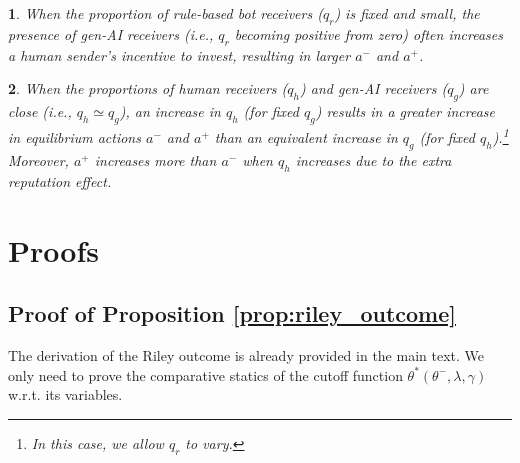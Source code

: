 \documentclass[english,12pt]{article}
\theoremstyle{plain}
\theoremstyle{plain}
\theoremstyle{definition}
\theoremstyle{definition}
\theoremstyle{assumption}
\theoremstyle{plain}
\theoremstyle{plain}
\theoremstyle{plain}
\theoremstyle{plain}
\theoremstyle{definition}%
\theoremstyle{plain}
\theoremstyle{plain}
\theoremstyle{plain}
\theoremstyle{plain}
\theoremstyle{plain}
\newtheorem{prediction}{\protect\predictionname}
\providecommand{\predictionname}{Prediction}
\begin{document}
\begin{prediction}
    When the proportion of rule-based bot receivers ($q_r$) is fixed and small, the presence of gen-AI receivers (i.e., $q_r$ becoming positive from zero) often increases a human sender's incentive to invest, resulting in larger $a^-$ and $a^+$.
\end{prediction}


\begin{prediction}
    When the proportions of human receivers ($q_h$) and gen-AI receivers ($q_g$) are close (i.e., $q_h\simeq q_g$), an increase in $q_h$ (for fixed $q_g$) results in a greater increase in equilibrium actions $a^-$ and $a^+$ than an equivalent increase in $q_g$ (for fixed $q_h$).\footnote{In this case, we allow $q_r$ to vary.} Moreover, $a^+$ increases more than $a^-$ when $q_h$ increases due to the extra reputation effect.
\end{prediction}


\newpage
\appendix
\section{Proofs}

\subsection{Proof of Proposition \ref{prop:riley_outcome}}

The derivation of the Riley outcome is already provided in the main text. We only need to prove the comparative statics of the cutoff function $\theta^*(\theta^-,\lambda,\gamma)$ w.r.t. its variables.
\end{document}
